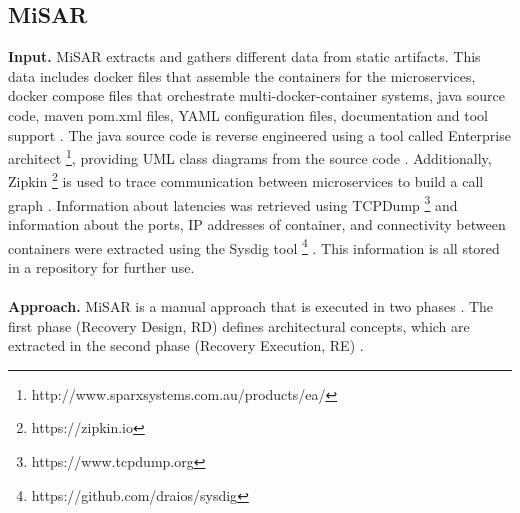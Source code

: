 \subsection{MiSAR}
\label{sec:Results:MiSAR}
\textbf{Input.}
MiSAR extracts and gathers different data from static artifacts.
This data includes docker files that assemble the containers for the microservices, docker compose files that orchestrate multi-docker-container systems, java source code, maven pom.xml files, YAML configuration files, documentation and tool support \cite{Alshuqayran2018MiSAR}.
The java source code is reverse engineered using a tool called Enterprise architect \footnote{http://www.sparxsystems.com.au/products/ea/}, providing UML class diagrams from the source code \cite{Alshuqayran2018MiSAR}.
Additionally, Zipkin \footnote{https://zipkin.io} is used to trace communication between microservices to build a call graph \cite{Alshuqayran2018MiSAR}.
Information about latencies was retrieved using TCPDump \footnote{https://www.tcpdump.org} and information about the ports, IP addresses of container, and connectivity between containers were extracted using the Sysdig tool \footnote{https://github.com/draios/sysdig} \cite{Alshuqayran2018MiSAR}.
This information is all stored in a repository for further use.
\\ \\
\textbf{Approach.}
MiSAR is a manual approach that is executed in two phases \cite{Alshuqayran2018MiSAR}.
The first phase (Recovery Design, RD) defines architectural concepts, which are extracted in the second phase (Recovery Execution, RE) \cite{Alshuqayran2018MiSAR}.






